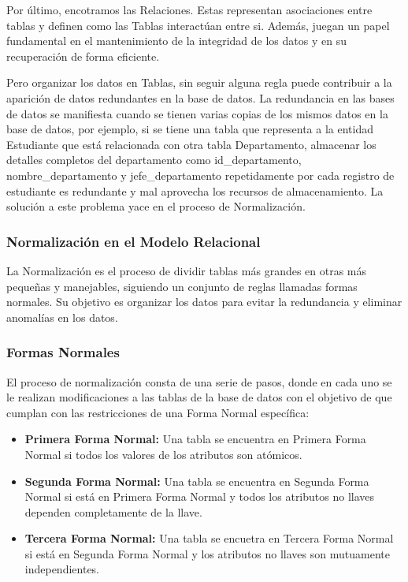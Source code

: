 Por \'ultimo, encotramos las Relaciones. Estas representan asociaciones entre tablas y definen como las Tablas interactúan
entre si. Además, juegan un papel fundamental en el mantenimiento de la integridad de los datos y en su recuperación de forma 
eficiente. 

Pero organizar los datos en Tablas, sin seguir alguna regla puede contribuir a la aparici\'on de datos redundantes en la 
base de datos. La redundancia en las bases de datos se manifiesta cuando se tienen varias copias de los mismos datos en la 
base de datos, por ejemplo, si se tiene una tabla que representa a la entidad Estudiante que est\'a relacionada con otra 
tabla Departamento, almacenar los detalles completos del departamento como id\_departamento, nombre\_departamento y 
jefe\_departamento repetidamente por cada registro de estudiante es redundante y mal aprovecha los recursos de 
almacenamiento. La soluci\'on a este problema yace en el proceso de Normalización.


\subsubsection{Normalización en el Modelo Relacional}

La Normalización es el proceso de dividir tablas m\'as grandes en otras m\'as pequeñas y manejables, siguiendo 
un conjunto de reglas llamadas formas normales. Su objetivo es organizar los datos para evitar la redundancia y 
eliminar anomalías en los datos.


\subsubsection{Formas Normales}

El proceso de normalizaci\'on consta de una serie de pasos, donde en cada uno se le realizan modificaciones a las tablas de 
la base de datos con el objetivo de que cumplan con las restricciones de una Forma Normal específica:

\begin{itemize}
    \item \textbf{Primera Forma Normal:} Una tabla se encuentra en Primera Forma Normal si todos los valores de los atributos
        son at\'omicos. 

    \item \textbf{Segunda Forma Normal:} Una tabla se encuentra en Segunda Forma Normal si est\'a en Primera Forma Normal
        y todos los atributos no llaves dependen completamente de la llave.

    \item \textbf{Tercera Forma Normal:} Una tabla se encuetra en Tercera Forma Normal si est\'a en Segunda Forma Normal 
        y los atributos no llaves son mutuamente independientes.
\end{itemize}

